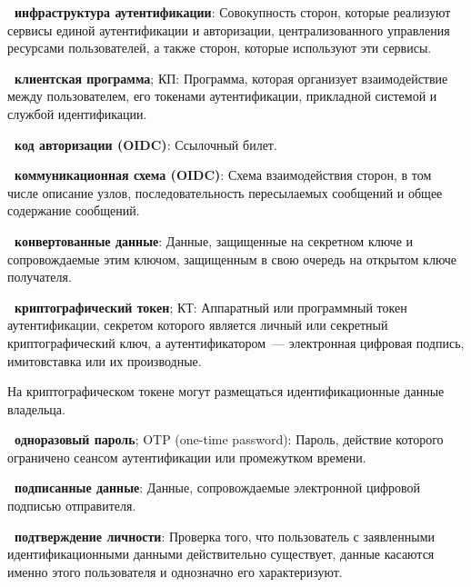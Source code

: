 {\bf \thedefctr~инфраструктура аутентификации}:
Совокупность сторон, которые реализуют сервисы единой аутентификации и
авторизации, централизованного управления ресурсами пользователей, а также
сторон, которые используют эти сервисы.

{\bf \thedefctr~клиентская программа}; КП:
Программа, которая организует взаимодействие между пользователем, его токенами
аутентификации, прикладной системой и службой идентификации.

{\bf \thedefctr~код авторизации (OIDC)}:
Ссылочный билет.

{\bf \thedefctr~коммуникационная схема (OIDC)}:
Схема взаимодействия сторон, в том числе описание узлов, последовательность
пересылаемых сообщений и общее содержание сообщений.

{\bf \thedefctr~конвертованные данные}: %
Данные, защищенные на секретном ключе и сопровождаемые этим ключом, защищенным в
свою очередь на открытом ключе получателя.

{\bf \thedefctr~криптографический токен}; КТ:
Аппаратный или программный токен аутентификации, секретом которого является
личный или секретный криптографический ключ, а аутентификатором~---  электронная
цифровая подпись, имитовставка или их производные.

\begin{note*}
На криптографическом токене могут размещаться идентификационные данные 
владельца.
\end{note*}

{\bf \thedefctr~одноразовый пароль}; OTP (one-time password): %
Пароль, действие которого ограничено сеансом аутентификации или промежутком 
времени.

{\bf \thedefctr~подписанные данные}: %
Данные, сопровождаемые электронной цифровой подписью отправителя. 

{\bf \thedefctr~подтверждение личности}:
Проверка того, что пользователь с заявленными идентификационными данными
действительно существует, данные касаются именно этого пользователя и однозначно
его характеризуют.


%

